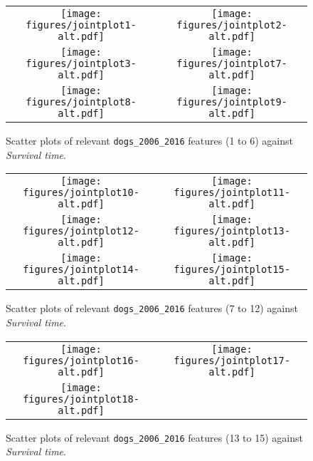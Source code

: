\documentclass[12pt]{report}
\begin{document}
\begin{subfigures}
\begin{figure}[hp]
  	\caption{Scatter plots of relevant \texttt{dogs\_2006\_2016} features (1 to 6) against \textit{Survival time}.}
  	\label{jointplotsfig:a}
	\begin{adjustwidth}{-1.5in}{-1in}
  	\centering
  	\begin{tabular}{cc}
  		\texttt{[image: figures/jointplot1-alt.pdf]} & 
  		\texttt{[image: figures/jointplot2-alt.pdf]} \\
		\texttt{[image: figures/jointplot3-alt.pdf]} &
		\texttt{[image: figures/jointplot7-alt.pdf]} \\
		\texttt{[image: figures/jointplot8-alt.pdf]} & 
  		\texttt{[image: figures/jointplot9-alt.pdf]} \\
  	\end{tabular}
  	\end{adjustwidth}
\end{figure}
\begin{figure}[hp]
	\caption{Scatter plots of relevant \texttt{dogs\_2006\_2016} features (7 to 12) against \textit{Survival time}.}
  	\label{jointplotsfig:b}
	\begin{adjustwidth}{-1.5in}{-1in}
  	\centering
  	\begin{tabular}{cc}
		\texttt{[image: figures/jointplot10-alt.pdf]} &
		\texttt{[image: figures/jointplot11-alt.pdf]} \\
		\texttt{[image: figures/jointplot12-alt.pdf]} &
		\texttt{[image: figures/jointplot13-alt.pdf]} \\
		\texttt{[image: figures/jointplot14-alt.pdf]} & 
  		\texttt{[image: figures/jointplot15-alt.pdf]} \\
  	\end{tabular}
  	\end{adjustwidth}
\end{figure}
\begin{figure}[hp]
	\caption{Scatter plots of relevant \texttt{dogs\_2006\_2016} features (13 to 15) against \textit{Survival time}.}
  	\label{jointplotsfig:c}
	\begin{adjustwidth}{-1.5in}{-1in}
  	\centering
  	\begin{tabular}{cc}
		\texttt{[image: figures/jointplot16-alt.pdf]} &
		\texttt{[image: figures/jointplot17-alt.pdf]} \\
		\texttt{[image: figures/jointplot18-alt.pdf]}
  	\end{tabular}
  	\end{adjustwidth}
\end{figure}
\end{subfigures}
\end{document}
